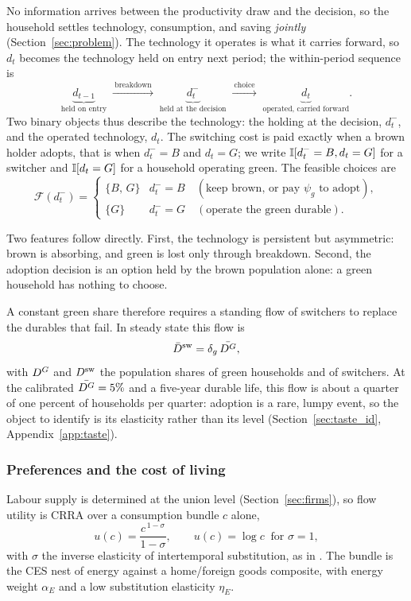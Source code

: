 No information arrives between the productivity draw and the decision, so the
household settles technology, consumption, and saving \emph{jointly}
(Section~\ref{sec:problem}). The technology it operates is what it carries
forward, so $d_t$ becomes the technology held on entry next period; the within-period
sequence is
%
\[
\underbrace{d_{t-1}}_{\text{held on entry}}
\;\xrightarrow{\ \text{breakdown}\ }\;
\underbrace{d^-_t}_{\text{held at the decision}}
\;\xrightarrow{\ \text{choice}\ }\;
\underbrace{d_t}_{\text{operated, carried forward}}.
\]
%
Two binary objects thus describe the technology: the holding at the decision, $d^-_t$,
and the operated technology, $d_t$. The switching cost is paid exactly when a brown
holder adopts, that is when $d^-_t=B$ and $d_t=G$; we write $\mathbb{I}[d^-_t=B, d_t=G]$ for a switcher
and $\mathbb{I}[d_t=G]$ for a household operating green. The feasible choices are
%
\[
\mathcal F(d^-_t)=
\begin{cases}
\{B,\,G\} & d^-_t=B \quad(\text{keep brown, or pay $\psi_g$ to adopt}),\\[2pt]
\{G\} & d^-_t=G \quad(\text{operate the green durable}).
\end{cases}
\]

Two features follow directly. First, the technology is
persistent but asymmetric: brown is absorbing, and green is lost only through
breakdown. Second, the adoption decision is an option held by the brown
population alone: a green household has nothing to choose.

A constant green share therefore requires a standing flow of switchers to replace the
durables that fail. In steady state this flow is
%
\begin{equation}
\bar D^{\mathrm{sw}}=\delta_g\,\bar{D^{G}},
\label{eq:switch-flow}
\end{equation}
%
with $D^{G}$ and $D^{\mathrm{sw}}$ the population shares of green households and of switchers. At
the calibrated $\bar{D^{G}}=5\%$ and a five-year durable life, this flow is about a
quarter of one percent of households per quarter: adoption is a rare, lumpy event,
so the object to identify is its elasticity rather than its level
(Section~\ref{sec:taste_id}, Appendix~\ref{app:taste}).

\subsubsection{Preferences and the cost of living}\label{sec:prefs}

Labour supply is determined at the union level (Section~\ref{sec:firms}), so flow
utility is CRRA over a consumption bundle $c$ alone,
%
\begin{equation}
u(c)=\frac{c^{\,1-\sigma}}{1-\sigma},
\qquad
u(c)=\log c \ \text{ for } \sigma=1,
\label{eq:felicity}
\end{equation}
%
with $\sigma$ the inverse elasticity of intertemporal substitution, as in \citet{auclert2023energy}. The bundle is the
\citet{auclert2023energy} CES nest of energy against a home/foreign goods composite, with
energy weight $\alpha_E$ and a low substitution elasticity $\eta_E$.


